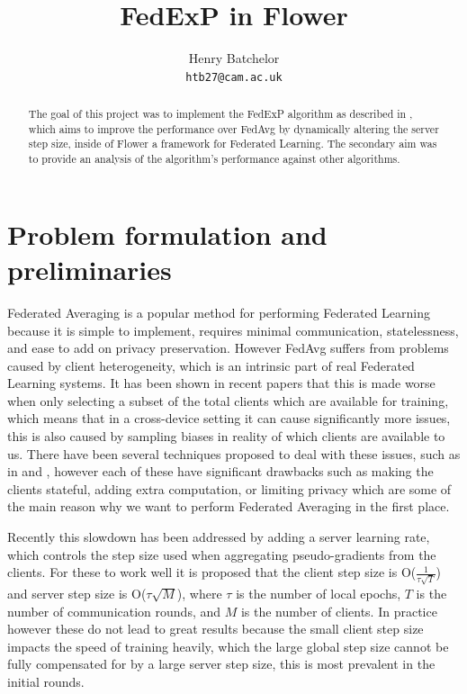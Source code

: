 \documentclass{article}
\title{FedExP in Flower}
\author{%
  Henry Batchelor\\
  \texttt{htb27@cam.ac.uk} \\
}
\begin{document}
\maketitle

\begin{abstract}
  The goal of this project was to implement the FedExP algorithm as described in \cite{FedExP}, which aims to improve the performance over FedAvg by dynamically altering the server step size, inside of Flower \cite{flower} a framework for Federated Learning.  The secondary aim was to provide an analysis of the algorithm's performance against other algorithms.
\end{abstract}

\section{Problem formulation and preliminaries}

Federated Averaging is a popular method for performing Federated Learning because it is simple to implement, requires minimal communication, statelessness, and ease to add on privacy preservation.  However FedAvg suffers from problems caused by client heterogeneity, which is an intrinsic part of real Federated Learning systems.  It has been shown in recent papers \cite{FewerClientsWorseBehaviour} that this is made worse when only selecting a subset of the total clients which are available for training, which means that in a cross-device setting it can cause significantly more issues, this is also caused by sampling biases in reality of which clients are available to us.  There have been several techniques proposed to deal with these issues, such as in \cite{signSGD} and \cite{ProxSkip}, however each of these have significant drawbacks such as making the clients stateful, adding extra computation, or limiting privacy which are some of the main reason why we want to perform Federated Averaging in the first place.  

Recently this slowdown has been addressed by adding a server learning rate, which controls the step size used when aggregating pseudo-gradients from the clients. \cite{AdaptiveFederatedOptimisation}  For these to work well it is proposed that the client step size is O($\frac{1}{\tau\sqrt{T}}$) and server step size is O($\tau\sqrt{M}$), where $\tau$ is the number of local epochs, $T$ is the number of communication rounds, and $M$ is the number of clients.  In practice however these do not lead to great results because the small client step size impacts the speed of training heavily, which the large global step size cannot be fully compensated for by a large server step size, this is most prevalent in the initial rounds.
\end{document}
